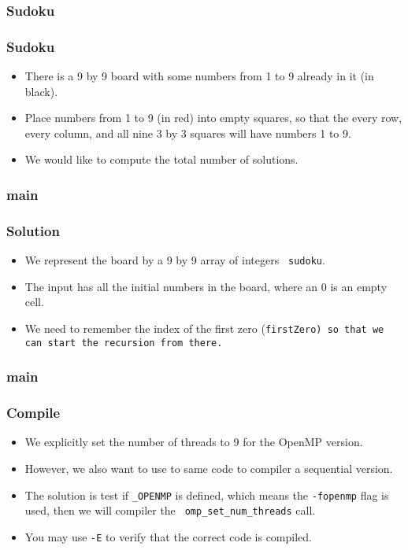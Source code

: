 \documentclass{beamer}
\begin{document}

\begin{frame}
\frametitle{Sudoku}
\centerline{}
\end{frame}

\begin{frame}
\frametitle{Sudoku}
\begin{itemize}
\item There is a 9 by 9 board with some numbers from 1 to 9 already in
  it (in black).
\item Place numbers from 1 to 9 (in red) into empty squares, so that
  the every row, every column, and all nine 3 by 3 squares will have
  numbers 1 to 9.
\item We would like to compute the total number of solutions.
\end{itemize}

\end{frame}


\begin{frame}
\frametitle{main} 
\end{frame}

\begin{frame}
\frametitle{Solution}
\begin{itemize}
\item We represent the board by a 9 by 9 array of integers {\tt
  sudoku}.
\item The input has all the initial numbers in the board, where an 0
  is an empty cell.
\item We need to remember the index of the first zero (\tt firstZero)
  so that we can start the recursion from there.
\end{itemize}
\end{frame}


\begin{frame}
\frametitle{main} 
\end{frame}

\begin{frame}
\frametitle{Compile}
\begin{itemize}
\item We explicitly set the number of threads to 9 for the OpenMP
  version.  
\item However, we also want to use to same code to compiler a
  sequential version. 
\item The solution is test if {\tt \_OPENMP} is defined, which means
  the {\tt -fopenmp} flag is used, then we will compiler the {\tt
    omp\_set\_num\_threads} call.
\item You may use {\tt -E} to verify that the correct code is
  compiled.
\end{itemize}
\end{frame}
\end{document}
